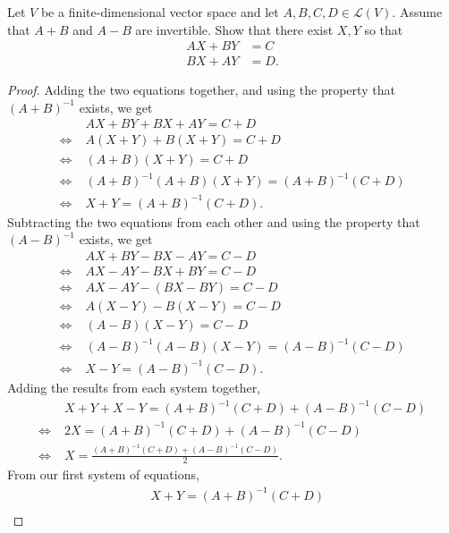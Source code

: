 Let $V$ be a finite-dimensional vector space and let $A,B,C,D \in \mathcal{L}(V)$.  Assume that $A+B$ and $A-B$ are invertible.  Show that there exist $X,Y$ so that
    \begin{align*}
    AX + BY &= C \\
    BX + AY &= D.
    \end{align*}
\begin{proof}
    Adding the two equations together, and using the property that $(A+B)^{-1}$ exists, we get
    \begin{align*}
        & AX + BY + BX + AY = C + D\\
        \Longleftrightarrow \;& A(X+Y) + B(X + Y) = C + D\\
        \Longleftrightarrow \;& (A+B)(X+Y) = C + D\\
        \Longleftrightarrow \;& (A+B)^{-1}(A+B)(X+Y) = (A+B)^{-1}(C+D)\\
        \Longleftrightarrow \;& X+Y = (A+B)^{-1}(C+D).
    \end{align*}
    Subtracting the two equations from each other and using the property that \\$(A-B)^{-1}$ exists, we get
    \begin{align*}
        & AX + BY - BX - AY = C - D\\
        \Longleftrightarrow \;& AX - AY - BX + BY = C - D\\
        \Longleftrightarrow \;& AX - AY - (BX - BY) = C - D\\
        \Longleftrightarrow \;& A(X-Y) - B(X-Y) = C - D\\
        \Longleftrightarrow \;& (A-B)(X-Y) = C - D\\
        \Longleftrightarrow \;& (A-B)^{-1}(A-B)(X-Y) = (A-B)^{-1}(C-D)\\
        \Longleftrightarrow \;& X-Y = (A-B)^{-1}(C-D).
    \end{align*}
    Adding the results from each system together,
    \begin{align*}
        & X+Y + X-Y= (A+B)^{-1}(C+D) + (A-B)^{-1}(C-D)\\
        \Longleftrightarrow \;& 2X  = (A+B)^{-1}(C+D) + (A-B)^{-1}(C-D)\\
        \Longleftrightarrow \;& X  = \frac{(A+B)^{-1}(C+D) + (A-B)^{-1}(C-D)}{2}.
    \end{align*}
    From our first system of equations,
    \begin{align*}
        & X + Y = (A+B)^{-1}(C+D)\\

\end{align*}
\end{proof}
